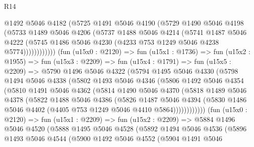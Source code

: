 \begin{lexlean}{R14}
\begin{coremodule}
                  @1492
                  @5046
                  @4182
                  (@5725
                    @1491
                    @5046
                    @4190
                    (@5729
                      @1490
                      @5046
                      @4198
                      (@5733
                        @1489
                        @5046
                        @4206
                        (@5737
                          @1488
                          @5046
                          @4214
                          (@5741
                            @1487
                            @5046
                            @4222
                            (@5745 @1486 @5046 @4230 (@4233 @753 @1249 @5046 @4238 @5774))))))))))))
        (fun (u15x0 : @2120) =>
        fun (u15x1 : @1736) =>
        fun (u15x2 : @1955) =>
        fun (u15x3 : @2209) =>
        fun (u15x4 : @1791) =>
        fun (u15x5 : @2209) =>
        @5790
          @1496
          @5046
          @4322
          (@5794
            @1495
            @5046
            @4330
            (@5798
              @1494
              @5046
              @4338
              (@5802
                @1493
                @5046
                @4346
                (@5806
                  @1492
                  @5046
                  @4354
                  (@5810
                    @1491
                    @5046
                    @4362
                    (@5814
                      @1490
                      @5046
                      @4370
                      (@5818
                        @1489
                        @5046
                        @4378
                        (@5822
                          @1488
                          @5046
                          @4386
                          (@5826
                            @1487
                            @5046
                            @4394
                            (@5830 @1486 @5046 @4402 (@4405 @753 @1249 @5046 @4410 @5864))))))))))))
        (fun (u15x0 : @2120) =>
        fun (u15x1 : @2209) =>
        fun (u15x2 : @2209) =>
        @5884
          @1496
          @5046
          @4520
          (@5888
            @1495
            @5046
            @4528
            (@5892
              @1494
              @5046
              @4536
              (@5896
                @1493
                @5046
                @4544
                (@5900
                  @1492
                  @5046
                  @4552
                  (@5904
                    @1491
                    @5046

\end{coremodule}
\end{lexlean}
